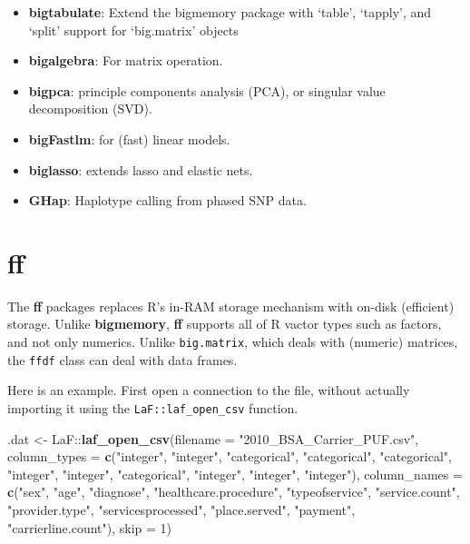 \documentclass[]{book}
\newenvironment{Shaded}{\begin{snugshade}}{\end{snugshade}}
\newcommand{\KeywordTok}[1]{\textcolor[rgb]{0.13,0.29,0.53}{\textbf{{#1}}}}
\newcommand{\DataTypeTok}[1]{\textcolor[rgb]{0.13,0.29,0.53}{{#1}}}
\newcommand{\DecValTok}[1]{\textcolor[rgb]{0.00,0.00,0.81}{{#1}}}
\newcommand{\StringTok}[1]{\textcolor[rgb]{0.31,0.60,0.02}{{#1}}}
\newcommand{\NormalTok}[1]{{#1}}
\providecommand{\tightlist}{%
  \setlength{\itemsep}{0pt}\setlength{\parskip}{0pt}}
\theoremstyle{definition}
\theoremstyle{definition}
\theoremstyle{remark}
\begin{document}
\begin{itemize}
\tightlist
\item
  \textbf{bigtabulate}: Extend the bigmemory package with `table',
  `tapply', and `split' support for `big.matrix' objects
\item
  \textbf{bigalgebra}: For matrix operation.
\item
  \textbf{bigpca}: principle components analysis (PCA), or singular
  value decomposition (SVD).
\item
  \textbf{bigFastlm}: for (fast) linear models.
\item
  \textbf{biglasso}: extends lasso and elastic nets.
\item
  \textbf{GHap}: Haplotype calling from phased SNP data.
\end{itemize}

\section{ff}\label{ff}

The \textbf{ff} packages replaces R's in-RAM storage mechanism with
on-disk (efficient) storage. Unlike \textbf{bigmemory}, \textbf{ff}
supports all of R vactor types such as factors, and not only numerics.
Unlike \texttt{big.matrix}, which deals with (numeric) matrices, the
\texttt{ffdf} class can deal with data frames.

Here is an example. First open a connection to the file, without
actually importing it using the \texttt{LaF::laf\_open\_csv} function.

\begin{Shaded}
\begin{Highlighting}[]
\NormalTok{.dat <-}\StringTok{ }\NormalTok{LaF::}\KeywordTok{laf_open_csv}\NormalTok{(}\DataTypeTok{filename =} \StringTok{"2010_BSA_Carrier_PUF.csv"}\NormalTok{,}
                    \DataTypeTok{column_types =} \KeywordTok{c}\NormalTok{(}\StringTok{"integer"}\NormalTok{, }\StringTok{"integer"}\NormalTok{, }\StringTok{"categorical"}\NormalTok{, }\StringTok{"categorical"}\NormalTok{, }\StringTok{"categorical"}\NormalTok{, }\StringTok{"integer"}\NormalTok{, }\StringTok{"integer"}\NormalTok{, }\StringTok{"categorical"}\NormalTok{, }\StringTok{"integer"}\NormalTok{, }\StringTok{"integer"}\NormalTok{, }\StringTok{"integer"}\NormalTok{), }
                    \DataTypeTok{column_names =} \KeywordTok{c}\NormalTok{(}\StringTok{"sex"}\NormalTok{, }\StringTok{"age"}\NormalTok{, }\StringTok{"diagnose"}\NormalTok{, }\StringTok{"healthcare.procedure"}\NormalTok{, }\StringTok{"typeofservice"}\NormalTok{, }\StringTok{"service.count"}\NormalTok{, }\StringTok{"provider.type"}\NormalTok{, }\StringTok{"servicesprocessed"}\NormalTok{, }\StringTok{"place.served"}\NormalTok{, }\StringTok{"payment"}\NormalTok{, }\StringTok{"carrierline.count"}\NormalTok{), }
                    \DataTypeTok{skip =} \DecValTok{1}\NormalTok{)}
\end{Highlighting}
\end{Shaded}
\end{document}
